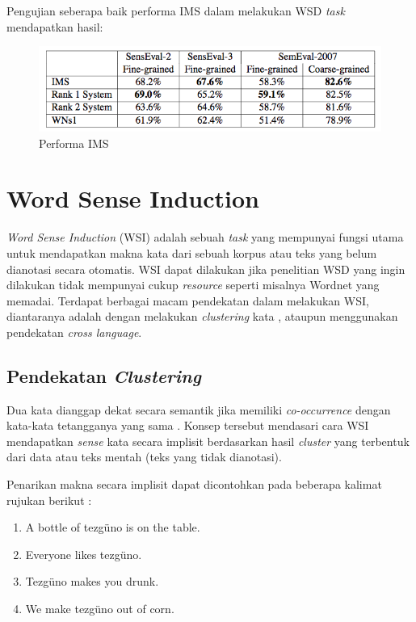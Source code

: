 Pengujian seberapa baik performa IMS dalam melakukan  WSD \textit{task} mendapatkan hasil:

\begin{figure}
	\centering
	\includegraphics[width=1\linewidth]{adit_pics/Performa-IMS}
	\caption{Performa IMS \citep{zhong2010makes}}
	\label{fig:Performa-IMS}
\end{figure}

\section{Word Sense Induction}
\textit{Word Sense Induction} (WSI) adalah sebuah \textit{task} yang mempunyai fungsi utama untuk mendapatkan makna kata dari sebuah korpus atau teks yang belum dianotasi secara otomatis. WSI dapat dilakukan jika penelitian WSD yang ingin dilakukan tidak mempunyai cukup \textit{resource} seperti misalnya Wordnet yang memadai. Terdapat berbagai macam pendekatan dalam melakukan WSI, diantaranya adalah dengan melakukan \textit{clustering} kata \citep{denkowski2009survey}, ataupun menggunakan pendekatan \textit{cross language}.
	
	\subsection{Pendekatan \textit{Clustering}}
	Dua kata dianggap dekat secara semantik jika memiliki \textit{co-occurrence} dengan kata-kata tetangganya yang sama \citep{nasiruddin2013state}. Konsep tersebut mendasari cara WSI mendapatkan \textit{sense} kata secara implisit berdasarkan hasil \textit{cluster} yang terbentuk dari data atau teks mentah (teks yang tidak dianotasi).
	
	Penarikan makna secara implisit dapat dicontohkan pada beberapa kalimat rujukan berikut \citep{denkowski2009survey}:
	
	\begin{enumerate}
		\item A bottle of tezg\"{u}no is on the table.
		\item Everyone likes tezg\"{u}no.
		\item Tezg\"{u}no makes you drunk.
		\item We make tezg\"{u}no out of corn.
	\end{enumerate}
	
